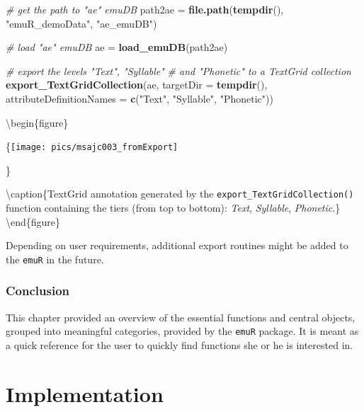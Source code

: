 \documentclass[]{book}
\newenvironment{Shaded}{\begin{snugshade}}{\end{snugshade}}
\newcommand{\CommentTok}[1]{\textcolor[rgb]{0.56,0.35,0.01}{\textit{#1}}}
\newcommand{\DataTypeTok}[1]{\textcolor[rgb]{0.13,0.29,0.53}{#1}}
\newcommand{\KeywordTok}[1]{\textcolor[rgb]{0.13,0.29,0.53}{\textbf{#1}}}
\newcommand{\NormalTok}[1]{#1}
\newcommand{\StringTok}[1]{\textcolor[rgb]{0.31,0.60,0.02}{#1}}
\begin{document}
\begin{Shaded}
\begin{Highlighting}[]
\CommentTok{# get the path to "ae" emuDB}
\NormalTok{path2ae =}\StringTok{ }\KeywordTok{file.path}\NormalTok{(}\KeywordTok{tempdir}\NormalTok{(), }\StringTok{"emuR_demoData"}\NormalTok{, }\StringTok{"ae_emuDB"}\NormalTok{)}

\CommentTok{# load "ae" emuDB}
\NormalTok{ae =}\StringTok{ }\KeywordTok{load_emuDB}\NormalTok{(path2ae)}

\CommentTok{# export the levels "Text", "Syllable"}
\CommentTok{# and "Phonetic" to a TextGrid collection}
\KeywordTok{export_TextGridCollection}\NormalTok{(ae,}
                          \DataTypeTok{targetDir =} \KeywordTok{tempdir}\NormalTok{(),}
                          \DataTypeTok{attributeDefinitionNames =} \KeywordTok{c}\NormalTok{(}\StringTok{"Text"}\NormalTok{,}
                                                       \StringTok{"Syllable"}\NormalTok{,}
                                                       \StringTok{"Phonetic"}\NormalTok{))}
\end{Highlighting}
\end{Shaded}

\textbackslash{}begin\{figure\}

\{\centering \texttt{[image: pics/msajc003\_fromExport]}

\}

\textbackslash{}caption\{TextGrid annotation generated by the \texttt{export\_TextGridCollection()} function containing the tiers (from top to bottom): \emph{Text}, \emph{Syllable}, \emph{Phonetic}.\}\label{fig:emuRfuncs-msajc003-fromExport}
\textbackslash{}end\{figure\}

Depending on user requirements, additional export routines might be added to the \texttt{emuR} in the future.

\hypertarget{conclusion-6}{%
\section{Conclusion}\label{conclusion-6}}

This chapter provided an overview of the essential functions and central objects, grouped into meaningful categories, provided by the \texttt{emuR} package. It is meant as a quick reference for the user to quickly find functions she or he is interested in.

\hypertarget{part-implementation}{%
\part{Implementation}\label{part-implementation}}
\end{document}
